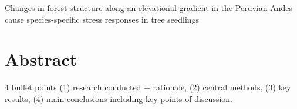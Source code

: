 \documentclass[a4paper,11pt]{article}
\begin{document}
\setlength{\parskip}{10pt}   %
\setlength{\headsep}{30pt} %
\setlength{\parindent}{0pt} %
%
%
%
\raggedright %
\begin{center}{\LARGE{Changes in forest structure along an elevational gradient in the Peruvian Andes cause species-specific stress responses in tree seedlings}}\end{center}  %

\section*{Abstract}
4 bullet points (1) research conducted + rationale, (2) central methods, (3) key results, (4) main conclusions including key points of discussion. 
\end{document}
